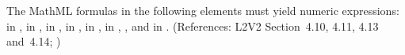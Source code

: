 The MathML formulas in the following elements must yield numeric
expressions:  in \KineticLaw,
 in \SpeciesReference,  in
\InitialAssignment,  in \AssignmentRule, 
in \RateRule,  in \AlgebraicRule, , and  in \EventAssignment.  (References:
L2V2 Section~4.10, 4.11, 4.13 and~4.14; )



